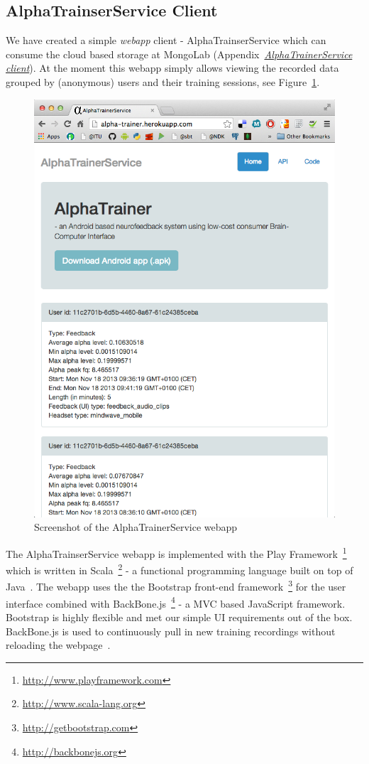\documentclass[a4paper,10pt,english,lof,lot,twoside]{puthesis}
\begin{document}
\subsection{AlphaTrainserService Client}
\label{ch-implementation/index:alphatrainserservice-client}\label{ch-implementation/index:ch-implementation-alphatrainer-service-client}
We have created a simple \emph{webapp} client - AlphaTrainserService
which can consume the cloud based storage at MongoLab (Appendix {\hyperref[appendix_software:appendix-alphatrainerservice-client]{\emph{AlphaTrainerService client}}}). At the moment this webapp
simply allows viewing the recorded data grouped by (anonymous) users and
their training sessions, see  Figure \ref{ch-implementation/index:fig-alpha-trainer-service}.
\begin{figure}[tbp]
\centering
\capstart

\includegraphics[width=0.800\linewidth]{alphatrainer-service.png}
\caption[AlphaTrainerService]{Screenshot of the AlphaTrainerService webapp}\label{ch-implementation/index:fig-alpha-trainer-service}\end{figure}

The AlphaTrainserService webapp is implemented with the Play Framework \footnote{
\href{http://www.playframework.com}{http://www.playframework.com}
} which is written in Scala \footnote{
\href{http://www.scala-lang.org}{http://www.scala-lang.org}
} - a functional
programming language built on top of Java \cite{hilton_play_2013}. The webapp uses the the Bootstrap front-end
framework \footnote{
\href{http://getbootstrap.com}{http://getbootstrap.com}
} for the user interface combined with
BackBone.js \footnote{
\href{http://backbonejs.org}{http://backbonejs.org}
} - a MVC based JavaScript
framework. Bootstrap is highly flexible and
met our simple UI requirements out of the box. BackBone.js is used to
continuously pull in new training recordings without reloading the webpage \cite{mirgorod_backbone._2013}.
\end{document}
